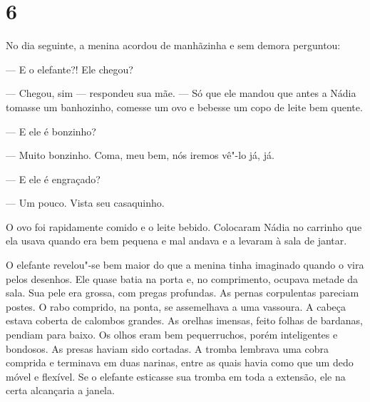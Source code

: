 \section{6}

No dia seguinte, a menina acordou de manhãzinha e sem demora perguntou:

--- E o elefante?! Ele chegou?

--- Chegou, sim --- respondeu sua mãe. --- Só que ele mandou que antes a
Nádia tomasse um banhozinho, comesse um ovo e bebesse um copo de leite
bem quente.

--- E ele é bonzinho?

--- Muito bonzinho. Coma, meu bem, nós iremos vê"-lo já, já.

--- E ele é engraçado?

--- Um pouco. Vista seu casaquinho.

O ovo foi rapidamente comido e o leite bebido. Colocaram Nádia no
carrinho que ela usava quando era bem pequena e mal andava e a levaram à
sala de jantar.

O elefante revelou"-se bem maior do que a menina tinha imaginado quando o
vira pelos desenhos. Ele quase batia na porta e, no comprimento,
ocupava metade da sala. Sua pele era grossa, com pregas profundas. As
pernas corpulentas pareciam postes. O rabo comprido, na ponta, se
assemelhava a uma vassoura. A cabeça estava coberta de calombos
grandes. As orelhas imensas, feito folhas de bardanas, pendiam para
baixo. Os olhos eram bem pequerruchos, porém inteligentes e bondosos. As
presas haviam sido cortadas. A tromba lembrava uma cobra comprida e
terminava em duas narinas, entre as quais havia como que um dedo móvel e
flexível. Se o elefante esticasse sua tromba em toda a extensão, ele na
certa alcançaria a janela.

